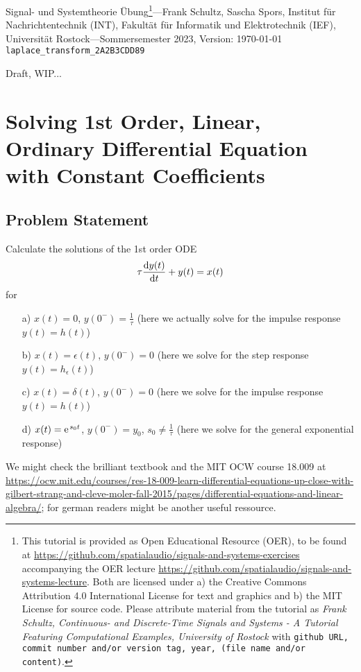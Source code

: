 \documentclass[11pt,a4paper,DIV=12]{scrartcl}
\begin{document}
%
\noindent Signal- und Systemtheorie Übung\footnote{This tutorial is provided as
Open Educational Resource (OER), to be found at
\url{https://github.com/spatialaudio/signals-and-systems-exercises}
accompanying the OER lecture
\url{https://github.com/spatialaudio/signals-and-systems-lecture}.
%
Both are licensed under a) the Creative Commons Attribution 4.0 International
License for text and graphics and b) the MIT License for source code.
%
Please attribute material from the tutorial as \textit{Frank Schultz,
Continuous- and Discrete-Time Signals and Systems - A Tutorial Featuring
Computational Examples, University of Rostock} with
\texttt{github URL, commit number and/or version tag, year, (file name and/or
content)}.}---Frank Schultz, Sascha Spors,
Institut für Nachrichtentechnik (INT),
Fakultät für Informatik und Elektrotechnik (IEF),
Universität Rostock---Sommersemester 2023, Version: \today\\
\verb|laplace_transform_2A2B3CDD89|

Draft, WIP...

\tableofcontents

\section{Solving 1st Order, Linear, Ordinary Differential Equation with
Constant Coefficients}
\subsection{Problem Statement}

Calculate the solutions of the 1st order ODE
\begin{align}
\tau \frac{\mathrm{d} y(t)}{\mathrm{d} t} + y(t) = x(t)
\end{align}
for
\begin{itemize}
\item[a)] $x(t) = 0$, $y(0^-)=\frac{1}{\tau}$ (here we actually solve for the impulse response $y(t)=h(t)$)
\item[b)] $x(t) = \epsilon(t)$, $y(0^-)=0$ (here we solve for the step response $y(t)=h_\epsilon(t)$)
\item[c)] $x(t) = \delta(t)$, $y(0^-)=0$ (here we solve for the impulse response $y(t)=h(t)$)
\item[d)] $x(t) = \e^{s_0 t}$, $y(0^-)=y_0$, $s_0 \neq \frac{1}{\tau}$ (here we solve for the general exponential response)
\end{itemize}

We might check the brilliant textbook \cite{Strang2014} and the MIT OCW course 18.009 at \url{https://ocw.mit.edu/courses/res-18-009-learn-differential-equations-up-close-with-gilbert-strang-and-cleve-moler-fall-2015/pages/differential-equations-and-linear-algebra/}; for german readers \cite{Burg2013} might be another useful ressource.
\end{document}
